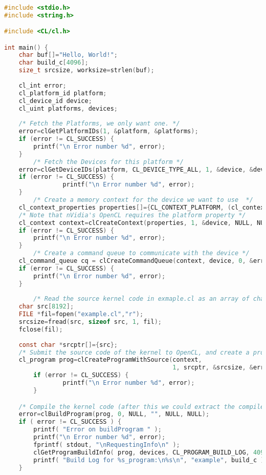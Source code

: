 \documentclass{article}
\begin{document}
\begin{lstlisting}[language=c]

#include <stdio.h>
#include <string.h>

#include <CL/cl.h>

int main() {
	char buf[]="Hello, World!";
	char build_c[4096];
	size_t srcsize, worksize=strlen(buf);
	
	cl_int error;
	cl_platform_id platform;
	cl_device_id device;
	cl_uint platforms, devices;
    
	/* Fetch the Platforms, we only want one. */
	error=clGetPlatformIDs(1, &platform, &platforms);
	if (error != CL_SUCCESS) {
		printf("\n Error number %d", error);
	}
        /* Fetch the Devices for this platform */
	error=clGetDeviceIDs(platform, CL_DEVICE_TYPE_ALL, 1, &device, &devices);
	if (error != CL_SUCCESS) {  
                printf("\n Error number %d", error);
	}
        /* Create a memory context for the device we want to use  */
	cl_context_properties properties[]={CL_CONTEXT_PLATFORM, (cl_context_properties)platform,0};
	/* Note that nVidia's OpenCL requires the platform property */
	cl_context context=clCreateContext(properties, 1, &device, NULL, NULL, &error);
	if (error != CL_SUCCESS) {
		printf("\n Error number %d", error);
	}
        /* Create a command queue to communicate with the device */
	cl_command_queue cq = clCreateCommandQueue(context, device, 0, &error);
	if (error != CL_SUCCESS) {
		printf("\n Error number %d", error);
	}
	
        /* Read the source kernel code in exmaple.cl as an array of char's */
	char src[8192];
	FILE *fil=fopen("example.cl","r");
	srcsize=fread(src, sizeof src, 1, fil);
	fclose(fil);
    
	const char *srcptr[]={src};
	/* Submit the source code of the kernel to OpenCL, and create a program object with it */
	cl_program prog=clCreateProgramWithSource(context,
                                              1, srcptr, &srcsize, &error);
        if (error != CL_SUCCESS) {
                printf("\n Error number %d", error);
        }

	/* Compile the kernel code (after this we could extract the compiled version) */
	error=clBuildProgram(prog, 0, NULL, "", NULL, NULL);
	if ( error != CL_SUCCESS ) {
		printf( "Error on buildProgram " );
		printf("\n Error number %d", error);
		fprintf( stdout, "\nRequestingInfo\n" );
		clGetProgramBuildInfo( prog, devices, CL_PROGRAM_BUILD_LOG, 4096, build_c, NULL );
		printf( "Build Log for %s_program:\n%s\n", "example", build_c );
	}
    

\end{lstlisting}
\end{document}

